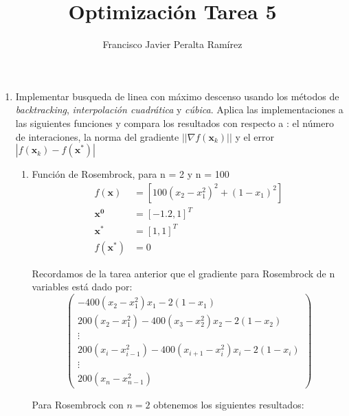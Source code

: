 \documentclass[10pt,twocolumn]{article}
\title {Optimización Tarea 5}
\author {Francisco Javier Peralta Ramírez}
\begin{document}
\maketitle
\begin{enumerate}

\item Implementar busqueda de linea con máximo descenso usando los métodos de \emph{backtracking}, \emph{interpolación cuadrática} y \emph{cúbica}. Aplica las implementaciones a las siguientes funciones y compara los resultados con respecto a : el número de interaciones, la norma del gradiente $||\nabla f(\boldsymbol{x}_k)||$ y el error $|f(\boldsymbol{x}_k) - f(\boldsymbol{x}^*)|$

\begin{enumerate}
\item Función de Rosembrock, para n = 2 y n = 100
\vspace{-2ex}
\begin{align*}
f(\boldsymbol{x}) &= [100 (x_2 - x_1^2)^2 + (1 - x_1)^2] \\
\boldsymbol{x^0} &= [-1.2, 1]^T \\
\boldsymbol{x^*} &= [1, 1]^T \\
f(\boldsymbol{x^*}) &= 0
\end{align*}

Recordamos de la tarea anterior que el gradiente para Rosembrock de n variables está dado por:
\vspace{-1ex}
$$
 \begin{pmatrix}
  -400(x_2 - x_1^2)x_1 - 2(1 - x_1) \\
  200(x_2 - x_1^2) - 400(x_3 - x_2^2)x_2 - 2(1 - x_2)\\
  \vdots\\
  200(x_{i} - x_{i-1}^2) - 400(x_{i+1} - x_i^2)x_i - 2(1 - x_i)\\
  \vdots\\
  200(x_{n} - x_{n-1}^2)
 \end{pmatrix}
$$

Para Rosembrock con $n = 2$ obtenemos los siguientes resultados:

\begin{table}[h]
\centering
\label{ros2}
\end{table}


\end{enumerate}
\end{enumerate}
\end{document}

